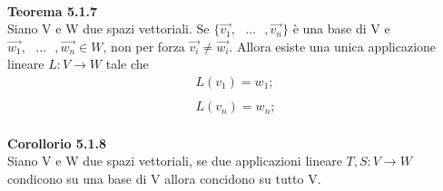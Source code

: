 \documentclass{article}
\begin{document}
\vspace{5px}
\textbf{\\Teorema 5.1.7}
\\Siano V e W due spazi vettoriali. Se $\{\vec{v_1},\text{ }\dots\text{ },\vec{v_n}\}$ è una base di V e $\vec{w_1},\text{ }\dots\text{ },\vec{w_n} \in W$, non per forza $\vec{v_i}\neq\vec{w_i}$. Allora esiste una unica applicazione lineare $L : V \to W$ tale che
\begin{align*}
  L(v_1)=w_1;\\
  \\
  L(v_n)=w_n;
\end{align*}
\vspace{5px}
\textbf{\\Corollorio 5.1.8}
\\Siano V e W due spazi vettoriali, se due applicazioni lineare $T,S:V \to W$ condicono su una base di V allora concidono su tutto V. 
\end{document}

